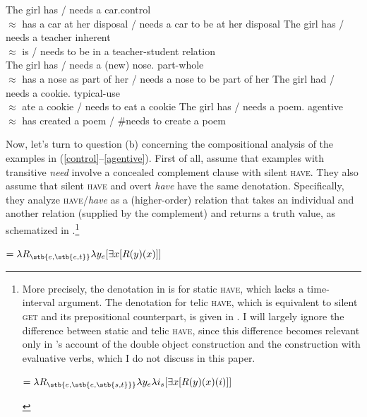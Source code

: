 \documentclass[output=paper]{langscibook}
\begin{document}
\ea \label{have-R}
\ea The girl has / needs a car.\hfill control\label{control}\\
$\approx$ has a car at her disposal / needs a car to be at her disposal
\ex The girl has / needs a teacher  \hfill inherent \label{inherent}\\
$\approx$ is / needs to be in a teacher-student relation\\
\ex The girl has / needs a (new) nose. \hfill part-whole\label{part-whole}\\
$\approx$ has a nose as part of her / needs a nose to be part of her
\ex The girl had / needs a cookie. \hfill typical-use\\
$\approx$ ate a cookie / needs to eat a cookie\label{typical-use}
\ex The girl has / needs a poem. \hfill agentive \label{agentive}\\
$\approx$ has created a poem / \#needs to create a poem
\z\z\largerpage[-1]

\noindent Now, let's turn to question (b) concerning the compositional analysis of the examples in (\ref{control}--\ref{agentive}). First of all, \citet{Zaroukian.Beller2013} assume that examples with transitive \textit{need} involve a concealed complement clause with silent \textsc{have}. They also assume that silent \textsc{have} and overt \textit{have} have the same denotation. Specifically, they analyze \textsc{have}/\textit{have} as a (higher-order) relation that takes an individual and another relation (supplied by the complement) and returns a truth value, as schematized in .\footnote{More precisely, the denotation in  is for static \textsc{have}, which lacks a time-interval argument. The denotation for telic \textsc{have}, which is equivalent to  silent \textsc{get} and its prepositional counterpart, is given in . I will largely ignore the difference between static and telic \textsc{have}, since this difference becomes relevant only in \citeauthor{Zaroukian.Beller2013}'s account of the double object construction and the construction with evaluative verbs, which I do not discuss in this paper.

\begin{exe}\ex\label{have-telic-formula}
 $= \lambda R_{\stb{e,\stb{e,\stb{s,t}}}} \lambda y_e \lambda i_s [\exists x [R(y)(x)(i)]]$ \hfill \citep[648]{Zaroukian.Beller2013}
\end{exe}}

\ea\label{have-formula}
 $= \lambda R_{\stb{e,\stb{e,t}}} \lambda y_e [\exists x [R(y)(x)]]$ \hfill \citep[649]{Zaroukian.Beller2013}
\z
\end{document}

